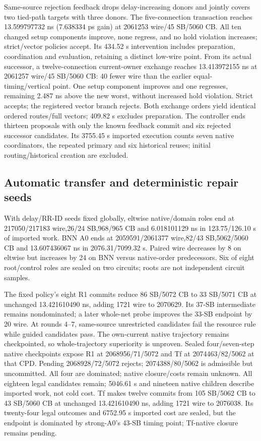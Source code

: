 \documentclass[conference,10pt]{IEEEtran}
\begin{document}
Same-source rejection feedback drops delay-increasing donors and jointly covers two tied-path targets with three donors. The five-connection transaction reaches 13.599797732 ns (7.638334 ps gain) at 2061253 wire/45 SB/5060 CB. All ten changed setup components improve, none regress, and no hold violation increases; strict/vector policies accept. Its 434.52 s intervention includes preparation, coordination and evaluation, retaining a distinct low-wire point. From its actual successor, a twelve-connection current-owner exchange reaches 13.413972155 ns at 2061257 wire/45 SB/5060 CB: 40 fewer wire than the earlier equal-timing/vertical point. One setup component improves and one regresses, remaining 2.487 ns above the new worst, without increased hold violation. Strict accepts; the registered vector branch rejects. Both exchange orders yield identical ordered routes/full vectors; 409.82 s excludes preparation. The controller ends thirteen proposals with only the known feedback commit and six rejected successor candidates. Its 3755.45 s imported execution counts seven native coordinators, the repeated primary and six historical reuses; initial routing/historical creation are excluded.

\subsection{Automatic transfer and deterministic repair seeds}
With delay/RR-ID seeds fixed globally, eltwise native/domain roles end at 217050/217183 wire,26/24 SB,968/965 CB and 6.018101129 ns in 123.75/126.10 s of imported work. BNN A0 ends at 2059591/2061377 wire,82/43 SB,5062/5060 CB and 13.607436067 ns in 2076.31/7099.32 s. Paired wire decreases by 8 on eltwise but increases by 24 on BNN versus native-order predecessors. Six of eight root/control roles are sealed on two circuits; roots are not independent circuit samples.

The fixed policy's eight R1 commits reduce 86 SB/5072 CB to 33 SB/5071 CB at unchanged 13.421610490 ns, adding 1721 wire to 2070629. Its 37-SB intermediate remains nondominated; a later whole-net probe improves the 33-SB endpoint by 20 wire. At rounds 4--7, same-source unrestricted candidates fail the resource rule while guided candidates pass. The own-current native trajectory remains checkpointed, so whole-trajectory superiority is unproven. Sealed four/seven-step native checkpoints expose R1 at 2068956/71/5072 and Tf at 2074463/82/5062 at that CPD. Pending 2068928/72/5072 rejects; 2074388/80/5062 is admissible but uncommitted. All four are dominated; native closure/costs remain unknown. All eighteen legal candidates remain; 5046.61 s and nineteen native children describe imported work, not cold cost. Tf makes twelve commits from 105 SB/5062 CB to 43 SB/5060 CB at unchanged 13.421610490 ns, adding 1721 wire to 2076038. Its twenty-four legal outcomes and 6752.95 s imported cost are sealed, but the endpoint is dominated by strong-A0's 43-SB timing point; Tf-native closure remains pending.
\end{document}
